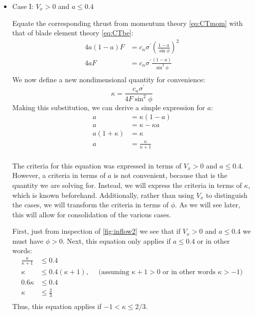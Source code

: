 \documentclass{article}
\begin{document}
\begin{itemize}

\item Case I: $V_x > 0$ and $a \le 0.4$

Equate the corresponding thrust from momentum theory \cref{eq:CTmom} with that of blade element theory \cref{eq:CTbe}:
\begin{equation}
    \begin{aligned}
        4 a (1 - a) F &= c_n \sigma^\prime \left(\frac{1-a}{\sin\phi}\right)^2\\
        4 a F &= c_n \sigma^\prime \frac{(1-a)}{\sin^2\phi}\\
    \end{aligned}
\end{equation}
We now define a new nondimensional quantity for convenience:
\begin{equation}
    \kappa = \frac{c_n \sigma^\prime}{4 F \sin^2 \phi}
\end{equation}
Making this substitution, we can derive a simple expression for $a$:
\begin{equation}
    \begin{aligned}
        a &= \kappa (1-a)\\
        a &= \kappa - \kappa a\\
        a (1 + \kappa) &= \kappa\\
        a &= \frac{\kappa}{\kappa + 1}\\
    \end{aligned}
\end{equation}

The criteria for this equation was expressed in terms of $V_x > 0$ and $a \le 0.4$.  However, a criteria in terms of $a$ is not convenient, because that is the quantity we are solving for.  Instead, we will express the criteria in terms of $\kappa$, which is known beforehand.  Additionally, rather than using $V_x$ to distinguish the cases, we will transform the criteria in terms of $\phi$.  As we will see later, this will allow for consolidation of the various cases.

First, just from inspection of \cref{fig:inflow2} we see that if $V_x > 0$ and $a \le 0.4$ we must have $\phi > 0$.  Next, this equation only applies if $a \le 0.4$ or in other words:
\begin{equation}
    \begin{aligned}
        \frac{\kappa}{\kappa + 1} &\le 0.4\\
        \kappa &\le 0.4 (\kappa + 1) ,\quad \text{ (assuming $\kappa + 1 > 0$ or in other words $\kappa > -1$)}\\
        0.6 \kappa &\le 0.4 \\
        \kappa &\le \frac{2}{3} \\
    \end{aligned}
\end{equation}
Thus, this equation applies if $-1 < \kappa \le 2/3$.


\end{itemize}
\end{document}
